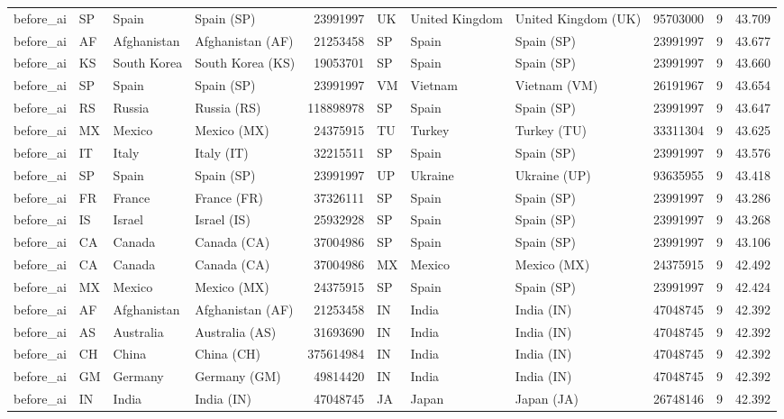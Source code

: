 \begin{tabular}{llllrlllrrr}
before\_ai & SP & Spain & Spain (SP) & 23991997 & UK & United Kingdom & United Kingdom (UK) & 95703000 & 9 & 43.709 \\
before\_ai & AF & Afghanistan & Afghanistan (AF) & 21253458 & SP & Spain & Spain (SP) & 23991997 & 9 & 43.677 \\
before\_ai & KS & South Korea & South Korea (KS) & 19053701 & SP & Spain & Spain (SP) & 23991997 & 9 & 43.660 \\
before\_ai & SP & Spain & Spain (SP) & 23991997 & VM & Vietnam & Vietnam (VM) & 26191967 & 9 & 43.654 \\
before\_ai & RS & Russia & Russia (RS) & 118898978 & SP & Spain & Spain (SP) & 23991997 & 9 & 43.647 \\
before\_ai & MX & Mexico & Mexico (MX) & 24375915 & TU & Turkey & Turkey (TU) & 33311304 & 9 & 43.625 \\
before\_ai & IT & Italy & Italy (IT) & 32215511 & SP & Spain & Spain (SP) & 23991997 & 9 & 43.576 \\
before\_ai & SP & Spain & Spain (SP) & 23991997 & UP & Ukraine & Ukraine (UP) & 93635955 & 9 & 43.418 \\
before\_ai & FR & France & France (FR) & 37326111 & SP & Spain & Spain (SP) & 23991997 & 9 & 43.286 \\
before\_ai & IS & Israel & Israel (IS) & 25932928 & SP & Spain & Spain (SP) & 23991997 & 9 & 43.268 \\
before\_ai & CA & Canada & Canada (CA) & 37004986 & SP & Spain & Spain (SP) & 23991997 & 9 & 43.106 \\
before\_ai & CA & Canada & Canada (CA) & 37004986 & MX & Mexico & Mexico (MX) & 24375915 & 9 & 42.492 \\
before\_ai & MX & Mexico & Mexico (MX) & 24375915 & SP & Spain & Spain (SP) & 23991997 & 9 & 42.424 \\
before\_ai & AF & Afghanistan & Afghanistan (AF) & 21253458 & IN & India & India (IN) & 47048745 & 9 & 42.392 \\
before\_ai & AS & Australia & Australia (AS) & 31693690 & IN & India & India (IN) & 47048745 & 9 & 42.392 \\
before\_ai & CH & China & China (CH) & 375614984 & IN & India & India (IN) & 47048745 & 9 & 42.392 \\
before\_ai & GM & Germany & Germany (GM) & 49814420 & IN & India & India (IN) & 47048745 & 9 & 42.392 \\
before\_ai & IN & India & India (IN) & 47048745 & JA & Japan & Japan (JA) & 26748146 & 9 & 42.392 \\

\end{tabular}
